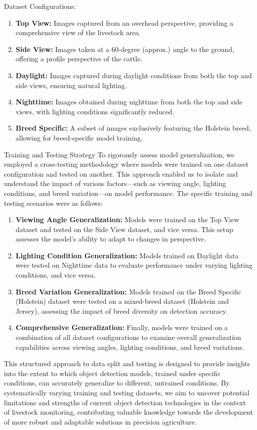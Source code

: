 Dataset Configurations:
\begin{enumerate}
 \item\textbf{Top View:} Images captured from an overhead perspective, providing a comprehensive view of the livestock area.
 \item\textbf{Side View:} Images taken at a 60-degree (approx.) angle to the ground, offering a profile perspective of the cattle.
 \item\textbf{Daylight:} Images captured during daylight conditions from both the top and side views, ensuring natural lighting.
 \item\textbf{Nighttime:} Images obtained during nighttime from both the top and side views, with lighting conditions significantly reduced.
 \item\textbf{Breed Specific:} A subset of images exclusively featuring the Holstein breed, allowing for breed-specific model training.
 \end{enumerate}
Training and Testing Strategy
To rigorously assess model generalization, we employed a cross-testing methodology where models were trained on one dataset configuration and tested on another. This approach enabled us to isolate and understand the impact of various factors—such as viewing angle, lighting conditions, and breed variation—on model performance. The specific training and testing scenarios were as follows:
\begin{enumerate}
 \item\textbf{Viewing Angle Generalization:} Models were trained on the Top View dataset and tested on the Side View dataset, and vice versa. This setup assesses the model's ability to adapt to changes in perspective.
 \item\textbf{Lighting Condition Generalization:} Models trained on Daylight data were tested on Nighttime data to evaluate performance under varying lighting conditions, and vice versa.
\item\textbf{Breed Variation Generalization:} Models trained on the Breed Specific (Holstein) dataset were tested on a mixed-breed dataset (Holstein and Jersey), assessing the impact of breed diversity on detection accuracy.
 \item\textbf{Comprehensive Generalization:} Finally, models were trained on a combination of all dataset configurations to examine overall generalization capabilities across viewing angles, lighting conditions, and breed variations.
 \end{enumerate}
This structured approach to data split and testing is designed to provide insights into the extent to which object detection models, trained under specific conditions, can accurately generalize to different, untrained conditions. By systematically varying training and testing datasets, we aim to uncover potential limitations and strengths of current object detection technologies in the context of livestock monitoring, contributing valuable knowledge towards the development of more robust and adaptable solutions in precision agriculture.

